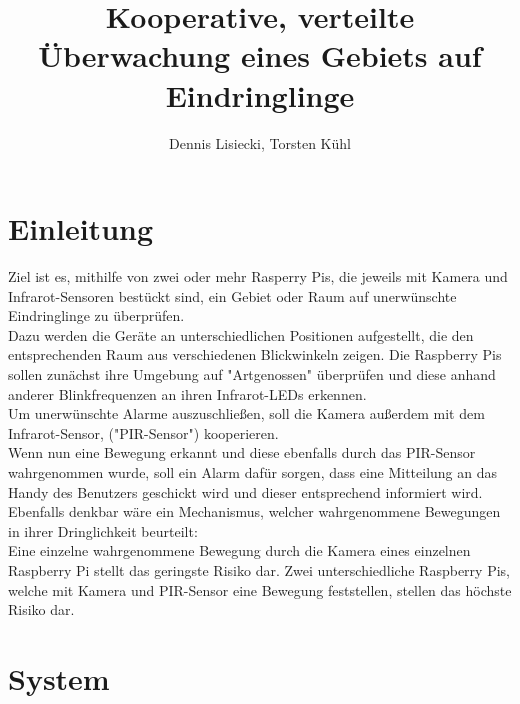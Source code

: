 \documentclass[journal, compsoc ]{IEEEtran}
\title{Kooperative, verteilte Überwachung eines Gebiets auf Eindringlinge}		%
\author{Dennis Lisiecki, Torsten Kühl}								%
\begin{document}

\maketitle	%




\section{Einleitung}
Ziel ist es, mithilfe von zwei oder mehr Rasperry Pis, die jeweils mit Kamera und Infrarot-Sensoren bestückt sind, ein Gebiet oder Raum auf unerwünschte Eindringlinge zu überprüfen.\\
Dazu werden die Geräte an unterschiedlichen Positionen aufgestellt, die den entsprechenden Raum aus verschiedenen Blickwinkeln zeigen. 
Die Raspberry Pis sollen zunächst ihre Umgebung auf "Artgenossen" überprüfen und diese anhand anderer Blinkfrequenzen an ihren Infrarot-LEDs erkennen. \\
Um unerwünschte Alarme auszuschließen, soll die Kamera außerdem mit dem Infrarot-Sensor, ("PIR-Sensor") kooperieren. \\
Wenn nun eine Bewegung erkannt und diese ebenfalls durch das PIR-Sensor wahrgenommen wurde, soll ein Alarm dafür sorgen, dass eine Mitteilung an das Handy des Benutzers geschickt wird und dieser entsprechend informiert wird.\\
Ebenfalls denkbar wäre ein Mechanismus, welcher wahrgenommene Bewegungen in ihrer Dringlichkeit beurteilt:\\
Eine einzelne wahrgenommene Bewegung durch die Kamera eines einzelnen Raspberry Pi stellt das geringste Risiko dar.
Zwei unterschiedliche Raspberry Pis, welche mit Kamera und PIR-Sensor eine Bewegung feststellen, stellen das höchste Risiko dar.




\section{System}
\end{document}
